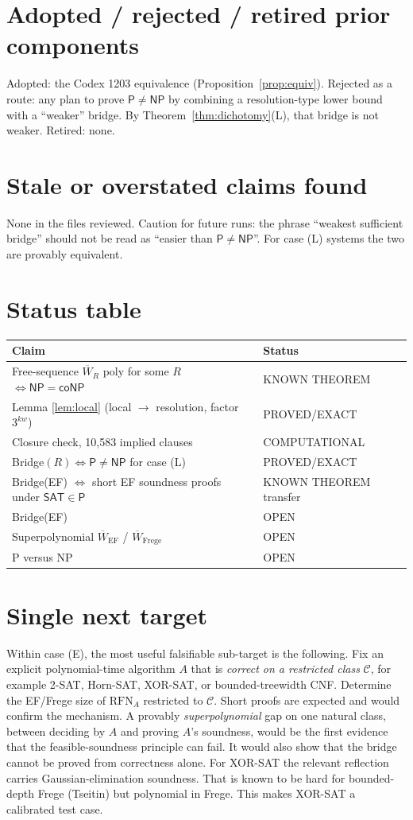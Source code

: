\documentclass[11pt]{article}
\newcommand{\SAT}{\mathsf{SAT}}
\newcommand{\Pc}{\mathsf{P}}
\newcommand{\NP}{\mathsf{NP}}
\newcommand{\coNP}{\mathsf{coNP}}
\newcommand{\Wb}{\overline W}
\begin{document}
\section*{Adopted / rejected / retired prior components}
Adopted: the Codex 1203 equivalence (Proposition~\ref{prop:equiv}).
Rejected as a route: any plan to prove $\Pc\ne\NP$ by combining a resolution-type
lower bound with a ``weaker'' bridge. By Theorem~\ref{thm:dichotomy}(L), that bridge
is not weaker. Retired: none.

\section*{Stale or overstated claims found}
None in the files reviewed. Caution for future runs: the phrase ``weakest sufficient bridge'' should not be read as
``easier than $\Pc\ne\NP$''. For case (L) systems the two are provably equivalent.

\section*{Status table}
\begin{longtable}{p{}p{}}
\toprule
Claim & Status\\ \midrule
Free-sequence $\Wb_R$ poly for some $R$ $\iff\NP=\coNP$ & KNOWN THEOREM\\
Lemma \ref{lem:local} (local $\to$ resolution, factor $3^{kw}$) & PROVED/EXACT\\
Closure check, 10{,}583 implied clauses & COMPUTATIONAL\\
Bridge$(R)\iff\Pc\ne\NP$ for case (L) & PROVED/EXACT\\
Bridge(EF) $\iff$ short EF soundness proofs under $\SAT\in\Pc$ & KNOWN THEOREM transfer\\
Bridge(EF) & OPEN\\
Superpolynomial $\Wb_{\mathrm{EF}}$ / $\Wb_{\mathrm{Frege}}$ & OPEN\\
P versus NP & OPEN\\ \bottomrule
\end{longtable}

\section*{Single next target}
Within case (E), the most useful falsifiable sub-target is the following. Fix an explicit polynomial-time
algorithm $A$ that is \emph{correct on a restricted class} $\mathcal C$, for example
2-SAT, Horn-SAT, XOR-SAT, or bounded-treewidth CNF. Determine the EF/Frege size of $\mathrm{RFN}_{A}$
restricted to $\mathcal C$. Short proofs are expected and would confirm the mechanism.
A provably \emph{superpolynomial} gap on one natural class, between deciding by $A$ and proving
$A$'s soundness, would be the first evidence that the feasible-soundness principle can fail.
It would also show that the bridge cannot be proved from correctness alone.
For XOR-SAT the relevant reflection carries Gaussian-elimination soundness. That is known to be hard for
bounded-depth Frege (Tseitin) but polynomial in Frege. This makes XOR-SAT a calibrated test case.

\end{document}
